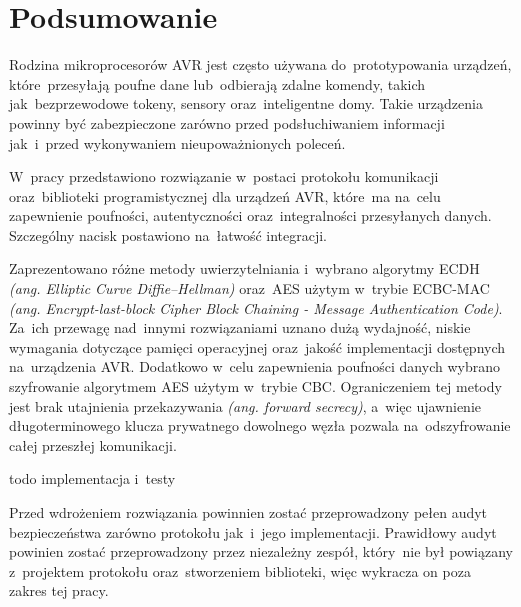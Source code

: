 \chapter*{Podsumowanie}
\label{cha:podsumowanie}

Rodzina mikroprocesorów AVR jest często używana do~prototypowania urządzeń, które~przesyłają poufne dane lub~odbierają zdalne komendy, takich jak~bezprzewodowe tokeny, sensory oraz~inteligentne domy. Takie urządzenia powinny być zabezpieczone zarówno przed podsłuchiwaniem informacji jak~i~przed wykonywaniem nieupoważnionych poleceń.

W~pracy przedstawiono rozwiązanie w~postaci protokołu komunikacji oraz~biblioteki programistycznej dla urządzeń AVR, które~ma na~celu zapewnienie poufności, autentyczności oraz~integralności przesyłanych danych. Szczególny nacisk postawiono na~łatwość integracji.

Zaprezentowano różne metody uwierzytelniania i~wybrano algorytmy ECDH \emph{(ang. Elliptic Curve Diffie--Hellman)} oraz~AES użytym w~trybie ECBC-MAC \emph{(ang. Encrypt-last-block Cipher Block Chaining - Message Authentication Code)}. Za~ich przewagę nad~innymi rozwiązaniami uznano dużą wydajność, niskie wymagania dotyczące pamięci operacyjnej oraz~jakość implementacji dostępnych na~urządzenia AVR. Dodatkowo w~celu zapewnienia poufności danych wybrano szyfrowanie algorytmem AES użytym w~trybie CBC. Ograniczeniem tej metody jest brak utajnienia przekazywania \emph{(ang. forward secrecy)}, a~więc ujawnienie długoterminowego klucza prywatnego dowolnego węzła pozwala na~odszyfrowanie całej przeszłej komunikacji.

todo implementacja i~testy

Przed wdrożeniem rozwiązania powinnien zostać przeprowadzony pełen audyt bezpieczeństwa zarówno protokołu jak~i~jego implementacji. Prawidłowy audyt powinien zostać przeprowadzony przez niezależny zespół, który~nie był powiązany z~projektem protokołu oraz~stworzeniem biblioteki, więc wykracza on poza zakres tej pracy.
